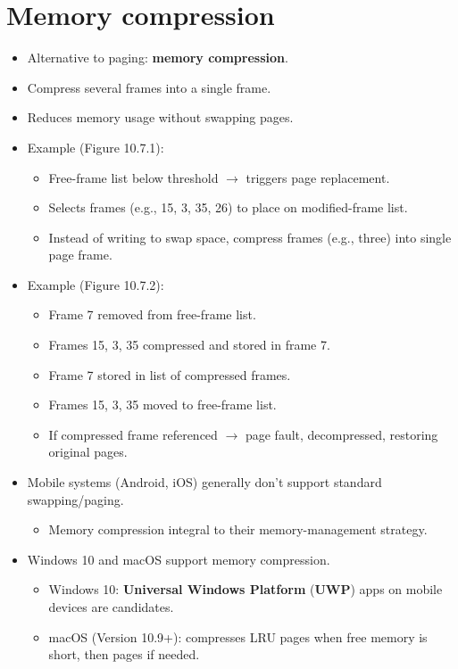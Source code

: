 \section{Memory compression}
\begin{itemize}
    \item Alternative to paging: \textbf{memory compression}.
    \item Compress several frames into a single frame.
    \item Reduces memory usage without swapping pages.
    \item Example (Figure 10.7.1):
    \begin{itemize}
        \item Free-frame list below threshold $\rightarrow$ triggers page replacement.
        \item Selects frames (e.g., 15, 3, 35, 26) to place on modified-frame list.
        \item Instead of writing to swap space, compress frames (e.g., three) into single page frame.
    \end{itemize}
    \item Example (Figure 10.7.2):
    \begin{itemize}
        \item Frame 7 removed from free-frame list.
        \item Frames 15, 3, 35 compressed and stored in frame 7.
        \item Frame 7 stored in list of compressed frames.
        \item Frames 15, 3, 35 moved to free-frame list.
        \item If compressed frame referenced $\rightarrow$ page fault, decompressed, restoring original pages.
    \end{itemize}
    \item Mobile systems (Android, iOS) generally don't support standard swapping/paging.
    \begin{itemize}
        \item Memory compression integral to their memory-management strategy.
    \end{itemize}
    \item Windows 10 and macOS support memory compression.
    \begin{itemize}
        \item Windows 10: \textbf{Universal Windows Platform} (\textbf{UWP}) apps on mobile devices are candidates.
        \item macOS (Version 10.9+): compresses LRU pages when free memory is short, then pages if needed.

\end{itemize}
\end{itemize}

